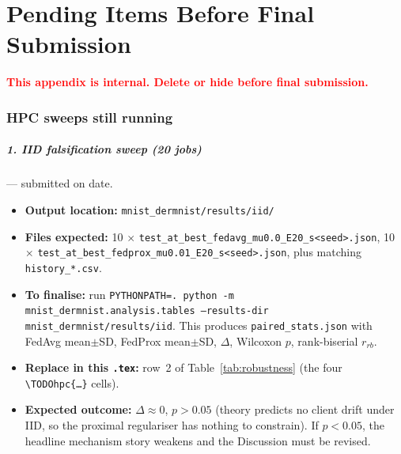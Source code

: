 \documentclass[11pt,a4paper]{report}
\newif\ifshowtodo
\newcommand{\TODOhpc}[1]{%
  \ifshowtodo\textcolor{red}{\textbf{[HPC PENDING: #1]}}\else#1\fi}
\begin{document}
\ifshowtodo
\chapter{Pending Items Before Final Submission}\label{sec:todo}
\textcolor{red}{\textbf{This appendix is internal. Delete or hide before
final submission.}}

\subsection*{HPC sweeps still running}

\paragraph{1. IID falsification sweep (20 jobs)} --- submitted on
\TODOhpc{date}.
\begin{itemize}
\item \textbf{Output location:} \texttt{mnist\_dermnist/results/iid/}
\item \textbf{Files expected:} 10 $\times$ \texttt{test\_at\_best\_fedavg\_mu0.0\_E20\_s<seed>.json},
  10 $\times$ \texttt{test\_at\_best\_fedprox\_mu0.01\_E20\_s<seed>.json},
  plus matching \texttt{history\_*.csv}.
\item \textbf{To finalise:} run
  \texttt{PYTHONPATH=. python -m mnist\_dermnist.analysis.tables --results-dir mnist\_dermnist/results/iid}.
  This produces \texttt{paired\_stats.json} with FedAvg mean$\pm$SD,
  FedProx mean$\pm$SD, $\Delta$, Wilcoxon $p$, rank-biserial $r_{rb}$.
\item \textbf{Replace in this \texttt{.tex}:} row~2 of
  Table~\ref{tab:robustness} (the four \texttt{\textbackslash TODOhpc\{\ldots\}} cells).
\item \textbf{Expected outcome:} $\Delta \approx 0$, $p > 0.05$ (theory
  predicts no client drift under IID, so the proximal regulariser has
  nothing to constrain). If $p < 0.05$, the headline mechanism story
  weakens and the Discussion must be revised.
\end{itemize}
\end{document}
